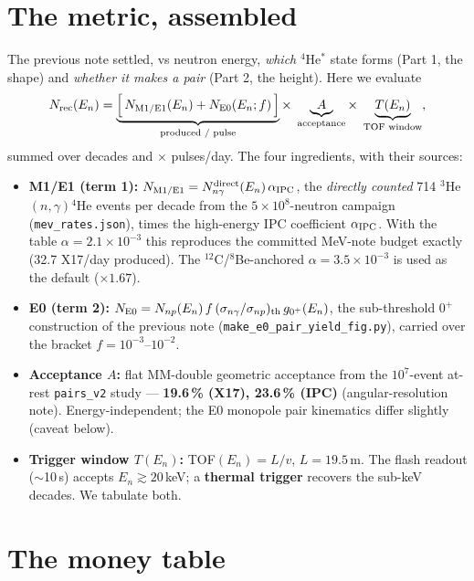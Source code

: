 \documentclass[11pt,a4paper]{article}
\newcommand{\He}[1]{$^{#1}$He}
\newcommand{\En}{E_n}
\begin{document}
\section{The metric, assembled}

The previous note settled, vs neutron energy, \emph{which} \He{4}$^*$ state
forms (Part 1, the shape) and \emph{whether it makes a pair} (Part 2, the
height). Here we evaluate
\[
N_{\rm rec}(\En)=\underbrace{\Big[\,N_{\rm M1/E1}(\En)+N_{\rm E0}(\En;f)\,\Big]}
   _{\text{produced / pulse}}\times\;
   \underbrace{A}_{\text{acceptance}}\times\;
   \underbrace{T(\En)}_{\text{TOF window}},
\]
summed over decades and $\times$ pulses/day. The four ingredients, with their
sources:
\begin{itemize}\setlength\itemsep{1pt}
  \item \textbf{M1/E1 (term 1):} $N_{\rm M1/E1}=N_{n\gamma}^{\rm direct}(\En)\,
    \alpha_{\rm IPC}$, the \emph{directly counted} 714 \He{3}$(n,\gamma)$\He{4}
    events per decade from the $5\times10^{8}$-neutron campaign
    (\texttt{mev\_rates.json}), times the high-energy IPC coefficient
    $\alpha_{\rm IPC}$. With the table $\alpha=2.1\times10^{-3}$ this
    reproduces the committed MeV-note budget exactly (32.7 X17/day produced).
    The $^{12}$C/$^8$Be-anchored $\alpha=3.5\times10^{-3}$ is used as the
    default ($\times1.67$).
  \item \textbf{E0 (term 2):} $N_{\rm E0}=N_{np}(\En)\,f\,
    (\sigma_{n\gamma}/\sigma_{np})_{\rm th}\,g_{0^+}(\En)$, the sub-threshold
    $0^+$ construction of the previous note (\texttt{make\_e0\_pair\_yield\_fig.py}),
    carried over the bracket $f=10^{-3}$--$10^{-2}$.
  \item \textbf{Acceptance $A$:} flat MM-double geometric acceptance from the
    $10^{7}$-event at-rest \texttt{pairs\_v2} study --- \textbf{19.6\,\% (X17),
    23.6\,\% (IPC)} (angular-resolution note). Energy-independent; the E0
    monopole pair kinematics differ slightly (caveat below).
  \item \textbf{Trigger window $T(\En)$:} TOF$(\En)=L/v$, $L=19.5$\,m.
    The flash readout ($\sim$10\,\textmu s) accepts $\En\gtrsim20$\,keV; a
    \textbf{thermal trigger} recovers the sub-keV decades. We tabulate both.
\end{itemize}

\section{The money table}
\end{document}
